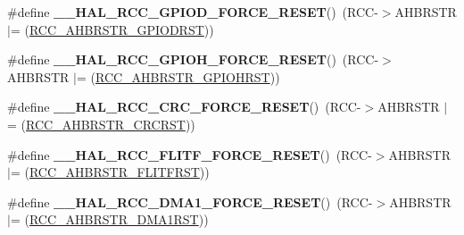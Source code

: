 \begin{DoxyCompactItemize}
\item 
\hypertarget{group___r_c_c___peripheral___clock___force___release_gaf0f7c49787fc94edeea74aa4218aeaf6}{\#define {\bfseries \-\_\-\-\_\-\-H\-A\-L\-\_\-\-R\-C\-C\-\_\-\-G\-P\-I\-O\-D\-\_\-\-F\-O\-R\-C\-E\-\_\-\-R\-E\-S\-E\-T}()~(R\-C\-C-\/$>$A\-H\-B\-R\-S\-T\-R $\vert$= (\hyperlink{group___peripheral___registers___bits___definition_ga9054c3b77b70344f0edb27e3397fee77}{R\-C\-C\-\_\-\-A\-H\-B\-R\-S\-T\-R\-\_\-\-G\-P\-I\-O\-D\-R\-S\-T}))}\label{group___r_c_c___peripheral___clock___force___release_gaf0f7c49787fc94edeea74aa4218aeaf6}

\item 
\hypertarget{group___r_c_c___peripheral___clock___force___release_ga4f05c575d762edf40a6d17f88671b68d}{\#define {\bfseries \-\_\-\-\_\-\-H\-A\-L\-\_\-\-R\-C\-C\-\_\-\-G\-P\-I\-O\-H\-\_\-\-F\-O\-R\-C\-E\-\_\-\-R\-E\-S\-E\-T}()~(R\-C\-C-\/$>$A\-H\-B\-R\-S\-T\-R $\vert$= (\hyperlink{group___peripheral___registers___bits___definition_ga4641a35381254234afb284547689e43c}{R\-C\-C\-\_\-\-A\-H\-B\-R\-S\-T\-R\-\_\-\-G\-P\-I\-O\-H\-R\-S\-T}))}\label{group___r_c_c___peripheral___clock___force___release_ga4f05c575d762edf40a6d17f88671b68d}

\item 
\hypertarget{group___r_c_c___peripheral___clock___force___release_gaf12ffda90699081f29cf76dab39b1944}{\#define {\bfseries \-\_\-\-\_\-\-H\-A\-L\-\_\-\-R\-C\-C\-\_\-\-C\-R\-C\-\_\-\-F\-O\-R\-C\-E\-\_\-\-R\-E\-S\-E\-T}()~(R\-C\-C-\/$>$A\-H\-B\-R\-S\-T\-R $\vert$= (\hyperlink{group___peripheral___registers___bits___definition_ga6e955ed3881dfd4a3a97b1bb13da0dde}{R\-C\-C\-\_\-\-A\-H\-B\-R\-S\-T\-R\-\_\-\-C\-R\-C\-R\-S\-T}))}\label{group___r_c_c___peripheral___clock___force___release_gaf12ffda90699081f29cf76dab39b1944}

\item 
\hypertarget{group___r_c_c___peripheral___clock___force___release_ga7d8fbf9b7297180113c2dc4b4bfa0a3f}{\#define {\bfseries \-\_\-\-\_\-\-H\-A\-L\-\_\-\-R\-C\-C\-\_\-\-F\-L\-I\-T\-F\-\_\-\-F\-O\-R\-C\-E\-\_\-\-R\-E\-S\-E\-T}()~(R\-C\-C-\/$>$A\-H\-B\-R\-S\-T\-R $\vert$= (\hyperlink{group___peripheral___registers___bits___definition_ga14792d6944967d58822d13c720f83ee8}{R\-C\-C\-\_\-\-A\-H\-B\-R\-S\-T\-R\-\_\-\-F\-L\-I\-T\-F\-R\-S\-T}))}\label{group___r_c_c___peripheral___clock___force___release_ga7d8fbf9b7297180113c2dc4b4bfa0a3f}

\item 
\hypertarget{group___r_c_c___peripheral___clock___force___release_ga9135dece327ecc27f333f86dcf3ba8ee}{\#define {\bfseries \-\_\-\-\_\-\-H\-A\-L\-\_\-\-R\-C\-C\-\_\-\-D\-M\-A1\-\_\-\-F\-O\-R\-C\-E\-\_\-\-R\-E\-S\-E\-T}()~(R\-C\-C-\/$>$A\-H\-B\-R\-S\-T\-R $\vert$= (\hyperlink{group___peripheral___registers___bits___definition_ga97c9487ca04b0a1a992d0f2e00df739c}{R\-C\-C\-\_\-\-A\-H\-B\-R\-S\-T\-R\-\_\-\-D\-M\-A1\-R\-S\-T}))}\label{group___r_c_c___peripheral___clock___force___release_ga9135dece327ecc27f333f86dcf3ba8ee}


\end{DoxyCompactItemize}
